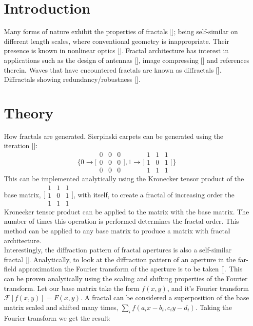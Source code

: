 \section{Introduction}
Many forms of nature exhibit the properties of fractals [\cite{Mandlebrot}]; being self-similar on different length scales, where conventional geometry is inappropriate. Their presence is known in nonlinear optics [\cite{Soljacic, Segev}]. Fractal architecture has interest in applications such as the design of antennas [\cite{Radonic,Puente-Baliarda,Siakavara}], image compressing [\cite{Jacquin}] and references therein. Waves that have encountered fractals are known as diffractals [\cite{Berry}]. Diffractals showing redundancy/robustness [\cite{Verma,Verma2}].


\section{Theory}
How fractals are generated. Sierpinski carpets can be generated using the iteration [\cite{Allouche,Velez}]:
\begin{equation}
\Bigg\{0\rightarrow \Bigg[\begin{array}{ccc}
0 & 0 & 0 \\
0 & 0 & 0\\
0 & 0 & 0\end{array}\Bigg], 1\rightarrow\Bigg[\begin{array}{ccc}
1 & 1 & 1 \\
1 & 0 & 1\\
1 & 1 & 1\end{array}\Bigg] \Bigg\}
\end{equation}
This can be implemented analytically using the Kronecker tensor product of the base matrix, $\Big[\begin{smallmatrix} 1 & 1 & 1 \\ 1 & 0 & 1\\ 1 & 1 & 1\end{smallmatrix}\Big]$, with itself, to create a fractal of increasing order the Kronecker tensor product can be applied to the matrix with the base matrix. The number of times this operation is performed determines the fractal order. This method can be applied to any base matrix to produce a matrix with fractal architecture.\\
Interestingly, the diffraction pattern of fractal apertures is also a self-similar fractal [\cite{Horvath,Hou,Skigin}]. Analytically, to look at the diffraction pattern of an aperture in the far-field approximation the Fourier transform of the aperture is to be taken [\cite{Scott1,Scott2}]. This can be proven analytically using the scaling and shifting properties of the Fourier transform. Let our base matrix take the form $f(x,y)$, and it's Fourier transform $\mathcal{F}[f(x,y)] = F(x,y)$. A fractal can be considered a superposition of the base matrix scaled and shifted many times, $\sum_i f(a_ix-b_i,c_iy-d_i)$. Taking the Fourier transform we get the result:
